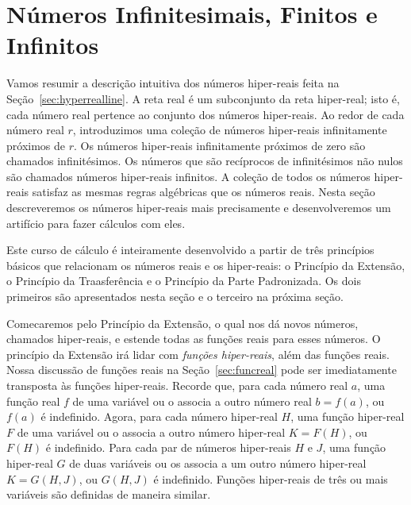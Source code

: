 \section{Números Infinitesimais, Finitos e Infinitos}
\label{sec:infnumbers}

Vamos resumir a descrição intuitiva dos números hiper-reais feita
na Seção~\ref{sec:hyperrealline}. A reta real é um subconjunto da
reta hiper-real; isto é, cada número real pertence ao conjunto dos
números hiper-reais. Ao redor de cada número real $r$, introduzimos
uma coleção de números hiper-reais infinitamente próximos de $r$. Os
números hiper-reais infinitamente próximos de zero são chamados
infinitésimos. Os números que são recíprocos de infinitésimos não nulos
são chamados números hiper-reais infinitos. A coleção de todos os números
hiper-reais satisfaz as mesmas regras algébricas que os números reais.
Nesta seção descreveremos os números hiper-reais mais precisamente
e desenvolveremos um artifício para fazer cálculos com eles.

Este curso de cálculo é inteiramente desenvolvido a partir de três
princípios básicos que relacionam os números reais e os hiper-reais:
o Princípio da Extensão, o Princípio da Traasferência e o Princípio
da Parte Padronizada. Os dois primeiros são apresentados nesta seção
e o terceiro na próxima seção.

Comecaremos pelo Princípio da Extensão, o qual nos dá novos números,
chamados hiper-reais, e estende todas as funções reais para esses números.
O princípio da Extensão irá lidar com \emph{funções hiper-reais}, além
das funções reais. Nossa discussão de funções reais na
Seção~\ref{sec:funcreal} pode ser imediatamente transposta às funções
hiper-reais. Recorde que, para cada número real $a$, uma função real $f$
de uma variável ou o associa a outro número real $b = f(a)$, ou $f(a)$
é indefinido. Agora, para cada número hiper-real $H$, uma função hiper-real
$F$ de uma variável ou o associa a outro número hiper-real $K = F(H)$, ou
$F(H)$ é indefinido. Para cada par de números hiper-reais $H$ e $J$, uma
função hiper-real $G$ de duas variáveis ou os associa a um outro número
hiper-real $K = G(H, J)$, ou $G(H, J)$ é indefinido. Funções hiper-reais
de três ou mais variáveis são definidas de maneira similar.


